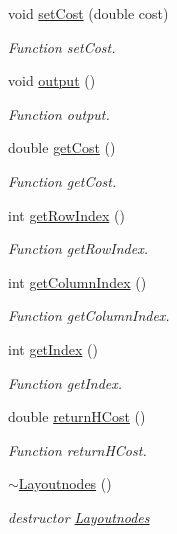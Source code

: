 \begin{DoxyCompactItemize}
void \hyperlink{classLayoutnodes_a9f37ce69889f98468afcfb3057457e44}{set\+Cost} (double cost)
\begin{DoxyCompactList}\small\item\em Function set\+Cost. \end{DoxyCompactList}\item 
void \hyperlink{classLayoutnodes_ac5c165f080d4c19de5779bac61080334}{output} ()
\begin{DoxyCompactList}\small\item\em Function output. \end{DoxyCompactList}\item 
double \hyperlink{classLayoutnodes_a6671cc8978fcb726aa1c842fecb1b97d}{get\+Cost} ()
\begin{DoxyCompactList}\small\item\em Function get\+Cost. \end{DoxyCompactList}\item 
int \hyperlink{classLayoutnodes_a4032ebcb6fb8af88214ec35e6598cfce}{get\+Row\+Index} ()
\begin{DoxyCompactList}\small\item\em Function get\+Row\+Index. \end{DoxyCompactList}\item 
int \hyperlink{classLayoutnodes_a290cfb6a96b0beb9e764442f2c79a535}{get\+Column\+Index} ()
\begin{DoxyCompactList}\small\item\em Function get\+Column\+Index. \end{DoxyCompactList}\item 
int \hyperlink{classLayoutnodes_ae9d58b708008c5ba3ca9cfa8d5340c25}{get\+Index} ()
\begin{DoxyCompactList}\small\item\em Function get\+Index. \end{DoxyCompactList}\item 
double \hyperlink{classLayoutnodes_ae4086c7670079e596f9cb5270f80c3b5}{return\+H\+Cost} ()
\begin{DoxyCompactList}\small\item\em Function return\+H\+Cost. \end{DoxyCompactList}\item 
\hyperlink{classLayoutnodes_a559826cd3519fe629734fb5d3323f956}{$\sim$\+Layoutnodes} ()
\begin{DoxyCompactList}\small\item\em destructor \hyperlink{classLayoutnodes}{Layoutnodes} \end{DoxyCompactList}\end{DoxyCompactItemize}


